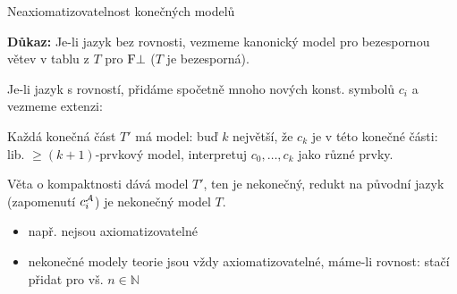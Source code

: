 \documentclass{beamer}
\begin{document}
\begin{frame}{Neaxiomatizovatelnost konečných modelů}

    \smallskip

    \pause

    \pause
    \textbf{Důkaz:} \pause
    \alert{Je-li jazyk bez rovnosti,} vezmeme  kanonický model pro bezespornou větev v tablu z $T$ pro $\mathrm{F}\bot$ ($T$ je bezesporná).
    
    \pause
    \alert{Je-li jazyk s rovností,} přidáme spočetně mnoho nových konst. symbolů $c_i$ a vezmeme extenzi: 

    \vspace{-2pt}

    \pause
    Každá \alert{konečná část} $T'$ má model: buď $k$ největší, že $c_k$ je v této konečné části: lib. $\geq(k+1)$-prvkový model,  interpretuj $c_0,\dots,c_k$ jako různé prvky.

    \vspace{-2pt}

    \pause
    \alert{Věta o kompaktnosti} dává model $T'$, ten je nekonečný, redukt na původní jazyk (zapomenutí $c_i^{\mathcal{A}}$) je nekonečný model $T$.\hfill\qedsymbol

    \pause
    \begin{itemize}
        \item např.  nejsou axiomatizovatelné\pause
        \item \alert{nekonečné modely} teorie jsou vždy axiomatizovatelné, máme-li rovnost: stačí přidat  pro vš. $n\in\mathbb N$
    \end{itemize}

\end{frame}
\end{document}
